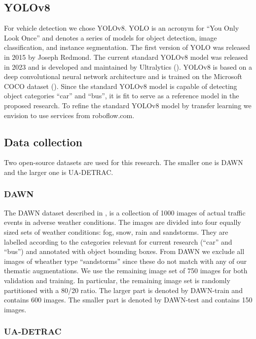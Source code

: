 \documentclass[]{article}
\begin{document}
\subsection{YOLOv8}

	For vehicle detection we chose YOLO{\small v8}. YOLO is an acronym for ``You Only Look Once'' and denotes a series of models for object detection, image classification, and instance segmentation. The first version of YOLO was released in 2015 by Joseph Redmond. The current standard YOLO{\small v8} model was released in 2023 and is developed and maintained by Ultralytics (\cite{yolov8_ultralytics}). YOLO{\small v8} is based on a deep convolutional neural network architecture and is trained on the Microsoft COCO dataset (\cite{linMicrosoftCOCOCommon2015a}). Since the standard YOLO{\small v8} model is capable of detecting object categories ``car'' and ``bus'', it is fit to serve as a reference model in the proposed research. To refine the standard YOLO{\small v8}  model by transfer learning we envision to use services from roboflow.com.  

\subsection{Data collection}

	Two open-source datasets are used for this research. The smaller one is DAWN and the larger one is UA-DETRAC.

\subsubsection{DAWN}

	The DAWN dataset described in \cite{bw1x-yh39-20}, is a collection of 1000 images of actual traffic events in adverse weather conditions. The images are divided into four equally sized sets of weather conditions: fog, snow, rain and sandstorms. They are labelled according to the categories relevant for current research (``car'' and ``bus'') and annotated with object bounding boxes. From DAWN we exclude all images of wheather type ``sandstorms'' since these do not match with any of our thematic augmentations. We use the remaining image set of 750 images for both validation and training. In particular, the remaining image set is randomly partitioned with a 80/20 ratio. The larger part is denoted by DAWN-train and contains 600 images. The smaller part is denoted by DAWN-test and contains 150 images.

\subsubsection{UA-DETRAC}
\end{document}

